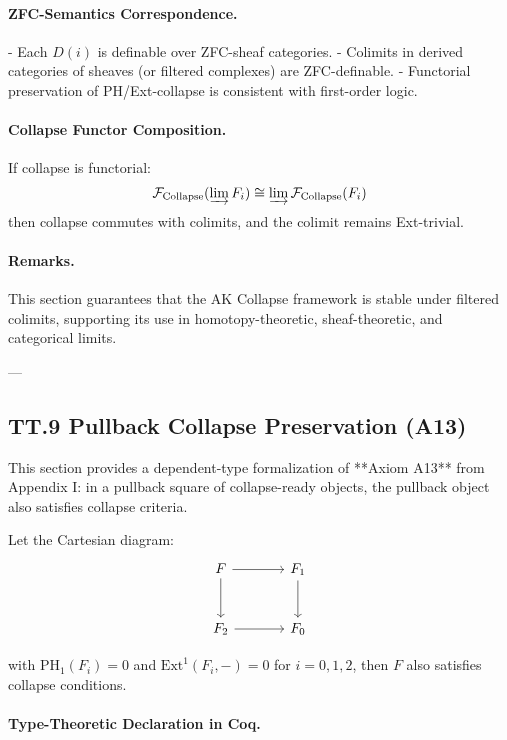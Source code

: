 \documentclass[11pt]{article}
\begin{document}
\paragraph{ZFC-Semantics Correspondence.}
- Each \( D(i) \) is definable over ZFC-sheaf categories.
- Colimits in derived categories of sheaves (or filtered complexes) are ZFC-definable.
- Functorial preservation of PH/Ext-collapse is consistent with first-order logic.

\paragraph{Collapse Functor Composition.}
If collapse is functorial:
\[
\mathcal{F}_{\text{Collapse}}(\varinjlim F_i) \cong \varinjlim \mathcal{F}_{\text{Collapse}}(F_i)
\]
then collapse commutes with colimits, and the colimit remains Ext-trivial.

\paragraph{Remarks.}
This section guarantees that the AK Collapse framework is stable under filtered colimits,  
supporting its use in homotopy-theoretic, sheaf-theoretic, and categorical limits.

---

\subsection*{TT.9 Pullback Collapse Preservation (A13)}

This section provides a dependent-type formalization of **Axiom A13** from Appendix I:  
in a pullback square of collapse-ready objects, the pullback object also satisfies collapse criteria.

Let the Cartesian diagram:
\[
\begin{tikzcd}[row sep=large, column sep=large]
F \arrow[r] \arrow[d] & F_1 \arrow[d] \\
F_2 \arrow[r] & F_0
\end{tikzcd}
\]

with \( \mathrm{PH}_1(F_i) = 0 \) and \( \mathrm{Ext}^1(F_i, -) = 0 \) for \( i = 0, 1, 2 \),  
then \( F \) also satisfies collapse conditions.

\paragraph{Type-Theoretic Declaration in Coq.}
\end{document}
